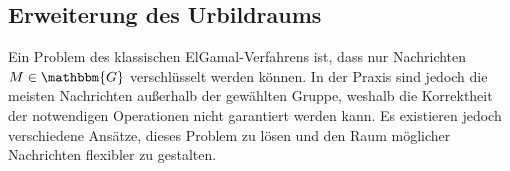 
\subsection{Erweiterung des Urbildraums} Ein Problem des klassischen
ElGamal-Verfahrens ist, dass nur Nachrichten $M \in \mathbbm{G}$
verschlüsselt werden können. In der Praxis sind jedoch die meisten
Nachrichten außerhalb der gewählten Gruppe, weshalb die Korrektheit der
notwendigen Operationen nicht garantiert werden kann. Es existieren
jedoch verschiedene Ansätze, dieses Problem zu lösen und den Raum
möglicher Nachrichten flexibler zu gestalten.

